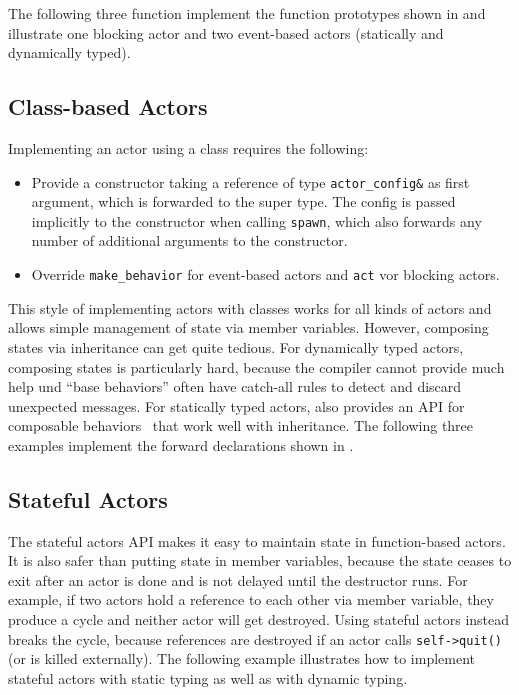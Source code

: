 The following three function implement the function prototypes shown in  and illustrate one blocking actor and two event-based actors (statically and dynamically typed).

\clearpage


\clearpage
\subsection{Class-based Actors}
\label{class-based}

Implementing an actor using a class requires the following:
\begin{itemize}
\item Provide a constructor taking a reference of type \lstinline^actor_config&^ as first argument, which is forwarded to the super type. The config is passed implicitly to the constructor when calling \lstinline^spawn^, which also forwards any number of additional arguments to the constructor.
\item Override \lstinline^make_behavior^ for event-based actors and \lstinline^act^ vor blocking actors.
\end{itemize}

This style of implementing actors with classes works for all kinds of actors and allows simple management of state via member variables. However, composing states via inheritance can get quite tedious. For dynamically typed actors, composing states is particularly hard, because the compiler cannot provide much help und ``base behaviors'' often have catch-all rules to detect and discard unexpected messages. For statically typed actors, \lib also provides an API for composable behaviors~ that work well with inheritance. The following three examples implement the forward declarations shown in .



\clearpage
\subsection{Stateful Actors}
\label{stateful-actor}

The stateful actors API makes it easy to maintain state in function-based actors. It is also safer than putting state in member variables, because the state ceases to exit after an actor is done and is not delayed until the destructor runs. For example, if two actors hold a reference to each other via member variable, they produce a cycle and neither actor will get destroyed. Using stateful actors instead breaks the cycle, because references are destroyed if an actor calls \lstinline^self->quit()^  (or is killed externally). The following example illustrates how to implement stateful actors with static typing as well as with dynamic typing.

